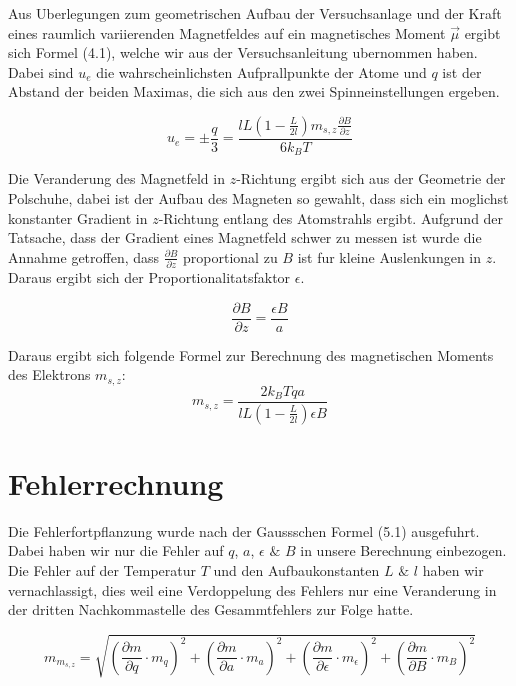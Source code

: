 \documentclass[a4paper,parskip,11pt, DIV12]{scrreprt}
\begin{document}
Aus Uberlegungen zum geometrischen Aufbau der Versuchsanlage und der Kraft eines raumlich variierenden Magnetfeldes auf ein magnetisches Moment $\vec{ \mu }$ ergibt sich Formel (4.1), welche wir aus der Versuchsanleitung ubernommen haben. Dabei sind $u_e$ die wahrscheinlichsten Aufprallpunkte der Atome und $q$ ist der Abstand der beiden Maximas, die sich aus den zwei Spinneinstellungen ergeben.


\begin{equation}
u_e=\pm \frac{q}{3}=\frac{lL(1-\frac{L}{2l})m_{s,z} \frac{\partial B}{\partial z}}{6k_BT}
\end{equation}

Die Veranderung des Magnetfeld in $z$-Richtung ergibt sich aus der Geometrie der Polschuhe, dabei ist der Aufbau des Magneten so gewahlt, dass sich ein moglichst konstanter Gradient in $z$-Richtung entlang des Atomstrahls ergibt. Aufgrund der Tatsache, dass der Gradient eines Magnetfeld schwer zu messen ist wurde die Annahme getroffen, dass $\frac{ \partial B}{ \partial z}$ proportional zu $B$ ist fur kleine Auslenkungen in $z$. Daraus ergibt sich der Proportionalitatsfaktor $\epsilon$.

\begin{equation}
\frac{\partial B}{\partial z}=\frac{\epsilon B}{a}
\end{equation}

Daraus ergibt sich folgende Formel zur Berechnung des magnetischen Moments des Elektrons $m_{s,z}$:
\begin{equation}
m_{s,z}=\frac{2k_BTqa}{lL(1-\frac{L}{2l})\epsilon B}
\end{equation}


\clearpage

\chapter{Fehlerrechnung}
Die Fehlerfortpflanzung wurde nach der Gaussschen Formel (5.1) ausgefuhrt. Dabei haben wir nur die Fehler auf $q$, $a$, $\epsilon$ $\&$ $B$ in unsere Berechnung einbezogen. Die Fehler auf der Temperatur $T$ und den Aufbaukonstanten $L$ $\&$ $l$ haben wir vernachlassigt, dies weil eine Verdoppelung des Fehlers nur eine Veranderung in der dritten Nachkommastelle des Gesammtfehlers zur Folge hatte.


\begin{equation}
m_{m_{s,z}}=\sqrt{(\frac{\partial m}{\partial q} \cdot m_q)^2+(\frac{\partial m}{\partial a} \cdot m_a)^2+(\frac{\partial m}{\partial \epsilon} \cdot m_\epsilon)^2+(\frac{\partial m}{\partial B} \cdot m_B)^2}
\end{equation}
\end{document}
